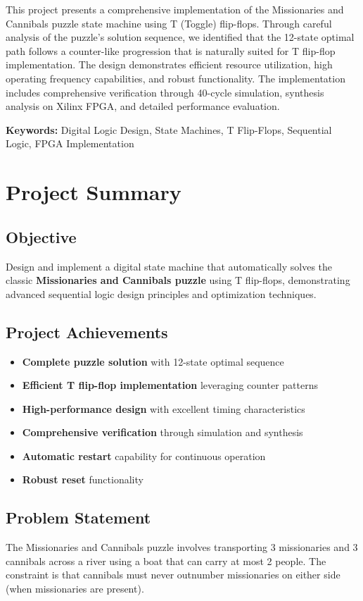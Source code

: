 \documentclass[12pt,letterpaper]{article}
\begin{document}
This project presents a comprehensive implementation of the Missionaries and Cannibals puzzle state machine using T (Toggle) flip-flops. Through careful analysis of the puzzle's solution sequence, we identified that the 12-state optimal path follows a counter-like progression that is naturally suited for T flip-flop implementation. The design demonstrates efficient resource utilization, high operating frequency capabilities, and robust functionality. The implementation includes comprehensive verification through 40-cycle simulation, synthesis analysis on Xilinx FPGA, and detailed performance evaluation.

\textbf{Keywords:} Digital Logic Design, State Machines, T Flip-Flops, Sequential Logic, FPGA Implementation

\newpage

\section{Project Summary}

\subsection{Objective}
Design and implement a digital state machine that automatically solves the classic \textbf{Missionaries and Cannibals puzzle} using T flip-flops, demonstrating advanced sequential logic design principles and optimization techniques.

\subsection{Project Achievements}
\begin{itemize}[label=$\checkmark$]
    \item \textbf{Complete puzzle solution} with 12-state optimal sequence
    \item \textbf{Efficient T flip-flop implementation} leveraging counter patterns
    \item \textbf{High-performance design} with excellent timing characteristics
    \item \textbf{Comprehensive verification} through simulation and synthesis
    \item \textbf{Automatic restart} capability for continuous operation
    \item \textbf{Robust reset} functionality
\end{itemize}

\subsection{Problem Statement}
The Missionaries and Cannibals puzzle involves transporting 3 missionaries and 3 cannibals across a river using a boat that can carry at most 2 people. The constraint is that cannibals must never outnumber missionaries on either side (when missionaries are present).
\end{document}
